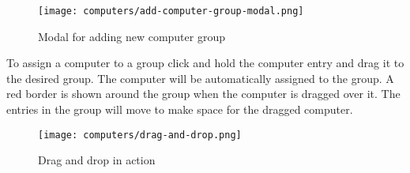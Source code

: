 \documentclass[../main.tex]{subfiles}
\begin{document}
\begin{figure}[H]
  \centering
  \texttt{[image: computers/add-computer-group-modal.png]}
  \caption{Modal for adding new computer group}
\end{figure}

To assign a computer to a group click and hold the computer entry and drag it to the desired group. The computer will be automatically assigned to the group.
A red border is shown around the group when the computer is dragged over it. The entries in the group will move to make space for the dragged computer.

\begin{figure}[H]
  \centering
  \texttt{[image: computers/drag-and-drop.png]}
  \caption{Drag and drop in action}
\end{figure}
\end{document}
